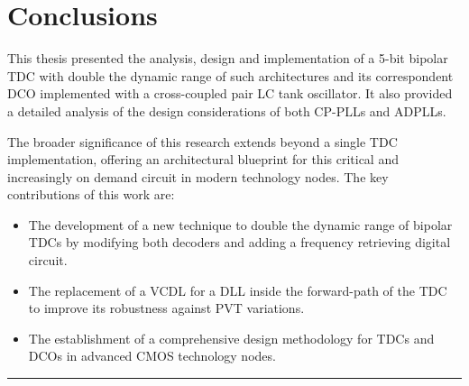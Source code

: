 \chapter{Conclusions}
This thesis presented the analysis, design and implementation of a 5-bit bipolar TDC with double the dynamic range of such architectures and its correspondent DCO implemented with
a cross-coupled pair LC tank oscillator. It also provided a detailed analysis of the design considerations of both CP-PLLs and ADPLLs.

The broader significance of this research extends beyond a single TDC implementation, offering an architectural blueprint for this critical and increasingly on demand circuit in
modern technology nodes.
\vspace{0.5cm}
The key contributions of this work are:

\begin{itemize}
    \item The development of a new technique to double the dynamic range of bipolar TDCs by modifying both decoders and adding a frequency retrieving digital circuit.
    \item The replacement of a VCDL for a DLL inside the forward-path of the TDC to improve its robustness against PVT variations.
    \item The establishment of a comprehensive design methodology for TDCs and DCOs in advanced CMOS technology nodes.
\end{itemize}

\noindent\rule{\textwidth}{1pt}